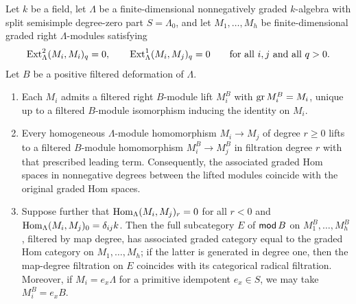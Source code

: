 \begin{proposition}
\label{prop:positive-module-lifting}
Let $k$ be a field, let $\Lambda$ be a finite-dimensional nonnegatively
graded $k$-algebra with split semisimple degree-zero part $S=\Lambda_0$, and
let $M_1,\ldots,M_h$ be finite-dimensional graded right $\Lambda$-modules
satisfying
\[
 \operatorname{Ext}^2_\Lambda(M_i,M_i)_q=0,\qquad
 \operatorname{Ext}^1_\Lambda(M_i,M_j)_q=0\qquad\text{for all }i,j\text{ and all }q>0.
\]
Let $B$ be a positive filtered deformation of $\Lambda$.
\begin{enumerate}[label={\upshape(\arabic*)}]
\item Each $M_i$ admits a filtered right $B$-module lift $M_i^B$ with
$\operatorname{gr} M_i^B=M_i$, unique up to a filtered $B$-module isomorphism inducing the
identity on $M_i$.
\item Every homogeneous $\Lambda$-module homomorphism $M_i\to M_j$ of degree
$r\geq0$ lifts to a filtered $B$-module homomorphism $M_i^B\to M_j^B$ in
filtration degree $r$ with that prescribed leading term. Consequently, the
associated graded Hom spaces in nonnegative degrees between the lifted
modules coincide with the original graded Hom spaces.
\item Suppose further that $\operatorname{Hom}_\Lambda(M_i,M_j)_r=0$ for all $r<0$ and
$\operatorname{Hom}_\Lambda(M_i,M_j)_0=\delta_{ij}k$. Then the full subcategory $E$ of
$\operatorname{\mathsf{mod}} B$ on $M_1^B,\ldots,M_h^B$, filtered by map degree, has associated
graded category equal to the graded Hom category on $M_1,\ldots,M_h$; if the
latter is generated in degree one, then the map-degree filtration on $E$
coincides with its categorical radical filtration. Moreover, if
$M_i=e_x\Lambda$ for a primitive idempotent $e_x\in S$, we may take
$M_i^B=e_x B$.
\end{enumerate}
\end{proposition}

